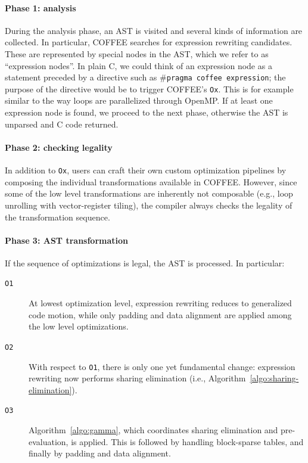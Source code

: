 \paragraph{Phase 1: analysis}
During the analysis phase, an AST is visited and several kinds of information are collected. In particular, COFFEE searches for expression rewriting candidates. These are represented by special nodes in the AST, which we refer to as ``expression nodes''. In plain C, we could think of an expression node as a statement preceded by a directive such as \texttt{$\#$pragma coffee expression}; the purpose of the directive would be to trigger COFFEE's \texttt{Ox}. This is for example similar to the way loops are parallelized through OpenMP. If at least one expression node is found, we proceed to the next phase, otherwise the AST is unparsed and C code returned.

\paragraph{Phase 2: checking legality}
In addition to \texttt{Ox}, users can craft their own custom optimization pipelines by composing the individual transformations available in COFFEE. However, since some of the low level transformations are inherently not composable (e.g., loop unrolling with vector-register tiling), the compiler always checks the legality of the transformation sequence. 

\paragraph{Phase 3: AST transformation}
If the sequence of optimizations is legal, the AST is processed. In particular:
\begin{description}
\item[\texttt{O1}] At lowest optimization level, expression rewriting reduces to generalized code motion, while only padding and data alignment are applied among the low level optimizations.
\item[\texttt{O2}] With respect to \texttt{O1}, there is only one yet fundamental change: expression rewriting now performs sharing elimination (i.e., Algorithm~\ref{algo:sharing-elimination}).
\item[\texttt{O3}] Algorithm~\ref{algo:gamma}, which coordinates sharing elimination and pre-evaluation, is applied. This is followed by handling block-sparse tables, and finally by padding and data alignment. 
\end{description}

